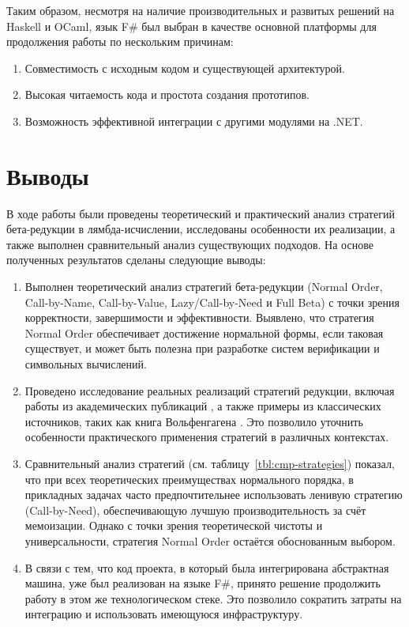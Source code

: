 Таким образом, несмотря на наличие производительных и развитых решений на Haskell и OCaml, язык F\# был выбран в качестве основной платформы для продолжения работы по нескольким причинам:
\begin{enumerate}
    \item Совместимость с исходным кодом и существующей архитектурой.
    \item Высокая читаемость кода и простота создания прототипов.
    \item Возможность эффективной интеграции с другими модулями на .NET.
\end{enumerate}



\section{Выводы}

В ходе работы были проведены теоретический и практический анализ стратегий бета-редукции в лямбда-исчислении, исследованы особенности их реализации, а также выполнен сравнительный анализ существующих подходов. На основе полученных результатов сделаны следующие выводы:

\begin{enumerate}
    \item Выполнен теоретический анализ стратегий бета-редукции (Normal Order, Call-by-Name, Call-by-Value, Lazy/Call-by-Need и Full Beta) с точки зрения корректности, завершимости и эффективности. Выявлено, что стратегия Normal Order обеспечивает достижение нормальной формы, если таковая существует, и может быть полезна при разработке систем верификации и символьных вычислений.
    
    \item Проведено исследование реальных реализаций стратегий редукции, включая работы из академических публикаций \cite{GarciaPerez2019, Krivine2007Abstract}, а также примеры из классических источников, таких как книга Вольфенгагена \cite{Wolfengagen2004}. Это позволило уточнить особенности практического применения стратегий в различных контекстах.

    \item Сравнительный анализ стратегий (см. таблицу~\ref{tbl:cmp-strategies}) показал, что при всех теоретических преимуществах нормального порядка, в прикладных задачах часто предпочтительнее использовать ленивую стратегию (Call-by-Need), обеспечивающую лучшую производительность за счёт мемоизации. Однако с точки зрения теоретической чистоты и универсальности, стратегия Normal Order остаётся обоснованным выбором.

    \item В связи с тем, что код проекта, в который была интегрирована абстрактная машина, уже был реализован на языке F\#, принято решение продолжить работу в этом же технологическом стеке. Это позволило сократить затраты на интеграцию и использовать имеющуюся инфраструктуру.

\end{enumerate}

